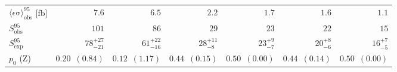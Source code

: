\begin{table}[H]
\begin{center}
\begin{tabular}{|lrrrrrr|}
$\langle\epsilon\mathrm{ \sigma}\rangle_\mathrm{ obs}^{95}$ [fb]   &$7.6$  & $6.5$  & $2.2$  & $1.7$ & $1.6$ & $1.1$ \\
$S_\mathrm{ obs}^{95}$     & $101$ & $86$ & $29$ &  $23$ & $22$ & $15$ \\
$S_\mathrm{ exp}^{95}$     & $ { 78 }^{ +27 }_{ -21 }$ & $ { 61 }^{ +22 }_{ -16 }$ & $ { 28 }^{ +11 }_{ -8 }$ & $ { 23}^{ +9}_{ -7 }$ & $ { 20 }^{ +8 }_{ -6 }$ & $ { 16 }^{ +7 }_{ -5 }$  \\
$p_{0}$ ($\mathrm{Z}$)        & $ 0.20$~$(0.84)$ & $ 0.12$~$(1.17)$ & $ 0.44$~$(0.15)$& $ 0.50$~$(0.00)$ &  $ 0.44$~$(0.14)$ &  $ 0.50$~$(0.00)$ \\
\hline
\end{tabular}




\end{center}
\end{table}

